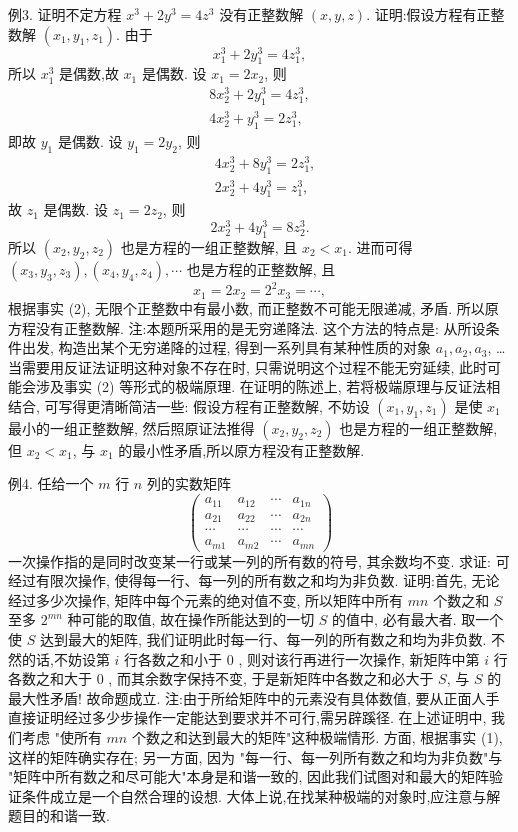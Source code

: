 例3. 证明不定方程 $x^3+2 y^3=4 z^3$ 没有正整数解 $(x, y, z)$.
证明:假设方程有正整数解 $\left(x_1, y_1, z_1\right)$. 由于
$$
x_1^3+2 y_1^3=4 z_1^3,
$$
所以 $x_1^3$ 是偶数,故 $x_1$ 是偶数.
设 $x_1=2 x_2$, 则
$$
\begin{gathered}
8 x_2^3+2 y_1^3=4 z_1^3, \\
4 x_2^3+y_1^3=2 z_1^3,
\end{gathered}
$$
即故 $y_1$ 是偶数.
设 $y_1=2 y_2$, 则
$$
\begin{aligned}
& 4 x_2^3+8 y_1^3=2 z_1^3, \\
& 2 x_2^3+4 y_1^3=z_1^3,
\end{aligned}
$$
故 $z_1$ 是偶数.
设 $z_1=2 z_2$, 则
$$
2 x_2^3+4 y_1^3=8 z_2^3 .
$$
所以 $\left(x_2, y_2, z_2\right)$ 也是方程的一组正整数解, 且 $x_2<x_1$.
进而可得 $\left(x_3, y_3, z_3\right),\left(x_4, y_4, z_4\right), \cdots$ 也是方程的正整数解, 且
$$
x_1=2 x_2=2^2 x_3=\cdots,
$$
根据事实 (2), 无限个正整数中有最小数, 而正整数不可能无限递减, 矛盾.
所以原方程没有正整数解.
注:本题所采用的是无穷递降法.
这个方法的特点是: 从所设条件出发, 构造出某个无穷递降的过程, 得到一系列具有某种性质的对象 $a_1, a_2, a_3$, … 当需要用反证法证明这种对象不存在时, 只需说明这个过程不能无穷延续, 此时可能会涉及事实 (2) 等形式的极端原理.
在证明的陈述上, 若将极端原理与反证法相结合, 可写得更清晰简洁一些: 假设方程有正整数解, 不妨设 $\left(x_1, y_1, z_1\right)$ 是使 $x_1$ 最小的一组正整数解, 然后照原证法推得 $\left(x_2, y_2, z_2\right)$ 也是方程的一组正整数解, 但 $x_2<x_1$, 与 $x_1$ 的最小性矛盾,所以原方程没有正整数解.



例4. 任给一个 $m$ 行 $n$ 列的实数矩阵
$$
\left(\begin{array}{cccc}
a_{11} & a_{12} & \cdots & a_{1 n} \\
a_{21} & a_{22} & \cdots & a_{2 n} \\
\cdots & \cdots & \cdots & \cdots \\
a_{m 1} & a_{m 2} & \cdots & a_{m n}
\end{array}\right)
$$
一次操作指的是同时改变某一行或某一列的所有数的符号, 其余数均不变.
求证: 可经过有限次操作, 使得每一行、每一列的所有数之和均为非负数.
证明:首先, 无论经过多少次操作, 矩阵中每个元素的绝对值不变, 所以矩阵中所有 $m n$ 个数之和 $S$ 至多 $2^{m n}$ 种可能的取值, 故在操作所能达到的一切 $S$ 的值中, 必有最大者.
取一个使 $S$ 达到最大的矩阵, 我们证明此时每一行、每一列的所有数之和均为非负数.
不然的话,不妨设第 $i$ 行各数之和小于 0 , 则对该行再进行一次操作, 新矩阵中第 $i$ 行各数之和大于 0 , 而其余数字保持不变, 于是新矩阵中各数之和必大于 $S$, 与 $S$ 的最大性矛盾!
故命题成立.
注:由于所给矩阵中的元素没有具体数值, 要从正面人手直接证明经过多少步操作一定能达到要求并不可行,需另辟蹊径.
在上述证明中, 我们考虑 "使所有 $m n$ 个数之和达到最大的矩阵"这种极端情形.
方面, 根据事实 (1), 这样的矩阵确实存在; 另一方面, 因为 "每一行、每一列所有数之和均为非负数"与 "矩阵中所有数之和尽可能大"本身是和谐一致的, 因此我们试图对和最大的矩阵验证条件成立是一个自然合理的设想.
大体上说,在找某种极端的对象时,应注意与解题目的和谐一致.



